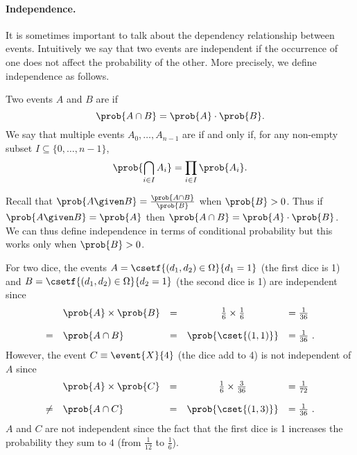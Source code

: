{\begin{comment}
%
By Bayes rule, we know that 
\[
\begin{array}{lll}
\prob{A \given B} 
& = &  
\frac
{\prob{A} \prob{B \given A}}
{\prob{B}}.
\\
& = & 
\frac
{0.001 \cdot 0.9}
{0.000945}
\\
& = & 0.953 
\end{array}
\]


\end{example}


\end{comment}








\paragraph{Independence.}

It is sometimes important to talk about the dependency relationship
between events.
%
Intuitively we say that two events are independent if  the occurrence
of one does not affect the probability of the other.
%
More precisely, we define independence as follows.  

\begin{definition}
Two events $A$ and $B$ are    if 
\[
\prob{A \cap B} = \prob{A} \cdot \prob{B}.
\]  
%
We say that multiple events $A_0, \dots, A_{n-1}$  are  if and only if, for any non-empty subset $I \subseteq \{0, \dots, n-1\}$,
\[
\prob{\bigcap_{i \in I} A_i} = \prod_{i\in I} \prob{A_i}.
\]
\end{definition}

Recall that  $\prob{A \given B} = \frac{\prob{A \cap
    B}}{\prob{B}}$ when $\prob{B} > 0$. Thus if $\prob{A \given B} = \prob{A}$ then
 $\prob{A \cap B} = \prob{A} \cdot \prob{B}$.
%
We can thus define independence in terms of conditional probability
but this works only when $\prob{B} > 0$. 



\begin{example}
For two dice, the events $A = \csetf{(d_1,d_2) \in
  \SSpace}{d_1=1}$ (the first dice is 1) and $B = \csetf{(d_1,d_2) \in
  \SSpace}{d_2=1}$ (the second dice is 1) are independent since
%
\[
\begin{array}{llccl}\
& \prob{A} \times \prob{B} & = & \frac{1}{6} \times \frac{1}{6} & = \frac{1}{36} \\[4mm]
= & \prob{A \cap B} & = & \prob{\cset{(1,1)}} & = \frac{1}{36}~.
\end{array}
\]
%
However, the event $C \equiv \event{X}{4}$ (the dice add to 4) is not independent of $A$
since 
\[
\begin{array}{llccl}
& \prob{A} \times \prob{C} & = &\frac{1}{6} \times \frac{3}{36} & = \frac{1}{72} \\[4mm]
\neq & \prob{A \cap C} & = & \prob{\cset{(1,3)}} & = \frac{1}{36}~.
\end{array}
\]
$A$ and $C$ are not
independent since the fact that the first dice is 1 increases the
probability they sum to $4$ (from $\frac{1}{12}$ to $\frac{1}{6}$).


\end{example}}
